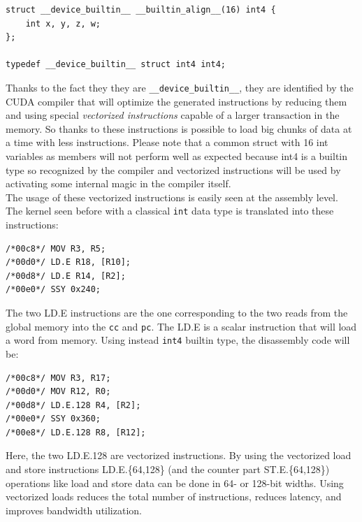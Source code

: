 \documentclass[paper=a4, fontsize=10pt]{scrartcl}	%
\begin{document}
	\begin{lstlisting}[style=CStyle]
struct __device_builtin__ __builtin_align__(16) int4 {
    int x, y, z, w;
};

typedef __device_builtin__ struct int4 int4;\end{lstlisting}

	Thanks to the fact they they are \texttt{\_\_device\_builtin\_\_}, they are identified by the CUDA compiler that will optimize the generated instructions by reducing them and using special \textit{vectorized instructions} capable of a larger transaction in the memory. So thanks to these instructions is possible to load big chunks of data at a time with less instructions. Please note that a common struct with 16 int variables as members will not perform well as expected because int4 is a builtin type so recognized by the compiler and vectorized instructions will be used by activating some internal magic in the compiler itself.\\

	The usage of these vectorized instructions is easily seen at the assembly level. The kernel seen before with a classical \texttt{int} data type is translated into these instructions:

	\begin{lstlisting}[style=CStyle]
/*00c8*/ MOV R3, R5;
/*00d0*/ LD.E R18, [R10];
/*00d8*/ LD.E R14, [R2]; 
/*00e0*/ SSY 0x240;      \end{lstlisting}

	The two LD.E instructions are the one corresponding to the two reads from the global memory into the \texttt{cc} and \texttt{pc}. The LD.E is a scalar instruction that will load a word from memory. Using instead \texttt{int4} builtin type, the disassembly code will be:

	\begin{lstlisting}[style=CStyle]
/*00c8*/ MOV R3, R17;        
/*00d0*/ MOV R12, R0;        
/*00d8*/ LD.E.128 R4, [R2];  
/*00e0*/ SSY 0x360;          
/*00e8*/ LD.E.128 R8, [R12]; \end{lstlisting}

	Here, the two LD.E.128 are vectorized instructions. By using the vectorized load and store instructions LD.E.\{64,128\} (and the counter part ST.E.\{64,128\}) operations like load and store data can be done in 64- or 128-bit widths. Using vectorized loads reduces the total number of instructions, reduces latency, and improves bandwidth utilization.\\
\end{document}
